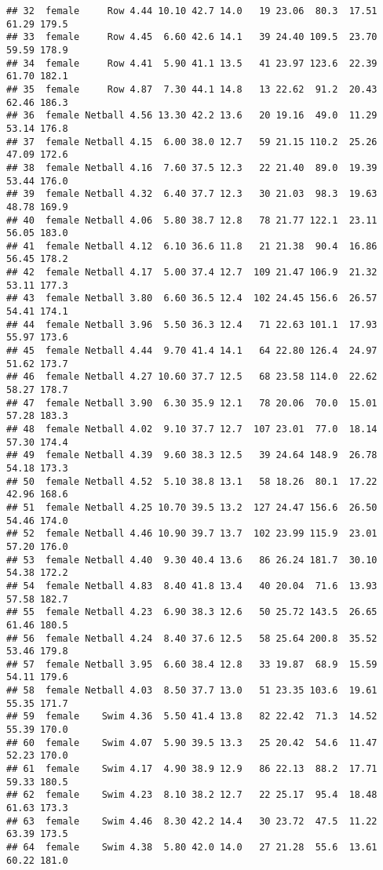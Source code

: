 \documentclass[
]{article}
\begin{document}
\begin{verbatim}
## 32  female     Row 4.44 10.10 42.7 14.0   19 23.06  80.3  17.51  61.29 179.5
## 33  female     Row 4.45  6.60 42.6 14.1   39 24.40 109.5  23.70  59.59 178.9
## 34  female     Row 4.41  5.90 41.1 13.5   41 23.97 123.6  22.39  61.70 182.1
## 35  female     Row 4.87  7.30 44.1 14.8   13 22.62  91.2  20.43  62.46 186.3
## 36  female Netball 4.56 13.30 42.2 13.6   20 19.16  49.0  11.29  53.14 176.8
## 37  female Netball 4.15  6.00 38.0 12.7   59 21.15 110.2  25.26  47.09 172.6
## 38  female Netball 4.16  7.60 37.5 12.3   22 21.40  89.0  19.39  53.44 176.0
## 39  female Netball 4.32  6.40 37.7 12.3   30 21.03  98.3  19.63  48.78 169.9
## 40  female Netball 4.06  5.80 38.7 12.8   78 21.77 122.1  23.11  56.05 183.0
## 41  female Netball 4.12  6.10 36.6 11.8   21 21.38  90.4  16.86  56.45 178.2
## 42  female Netball 4.17  5.00 37.4 12.7  109 21.47 106.9  21.32  53.11 177.3
## 43  female Netball 3.80  6.60 36.5 12.4  102 24.45 156.6  26.57  54.41 174.1
## 44  female Netball 3.96  5.50 36.3 12.4   71 22.63 101.1  17.93  55.97 173.6
## 45  female Netball 4.44  9.70 41.4 14.1   64 22.80 126.4  24.97  51.62 173.7
## 46  female Netball 4.27 10.60 37.7 12.5   68 23.58 114.0  22.62  58.27 178.7
## 47  female Netball 3.90  6.30 35.9 12.1   78 20.06  70.0  15.01  57.28 183.3
## 48  female Netball 4.02  9.10 37.7 12.7  107 23.01  77.0  18.14  57.30 174.4
## 49  female Netball 4.39  9.60 38.3 12.5   39 24.64 148.9  26.78  54.18 173.3
## 50  female Netball 4.52  5.10 38.8 13.1   58 18.26  80.1  17.22  42.96 168.6
## 51  female Netball 4.25 10.70 39.5 13.2  127 24.47 156.6  26.50  54.46 174.0
## 52  female Netball 4.46 10.90 39.7 13.7  102 23.99 115.9  23.01  57.20 176.0
## 53  female Netball 4.40  9.30 40.4 13.6   86 26.24 181.7  30.10  54.38 172.2
## 54  female Netball 4.83  8.40 41.8 13.4   40 20.04  71.6  13.93  57.58 182.7
## 55  female Netball 4.23  6.90 38.3 12.6   50 25.72 143.5  26.65  61.46 180.5
## 56  female Netball 4.24  8.40 37.6 12.5   58 25.64 200.8  35.52  53.46 179.8
## 57  female Netball 3.95  6.60 38.4 12.8   33 19.87  68.9  15.59  54.11 179.6
## 58  female Netball 4.03  8.50 37.7 13.0   51 23.35 103.6  19.61  55.35 171.7
## 59  female    Swim 4.36  5.50 41.4 13.8   82 22.42  71.3  14.52  55.39 170.0
## 60  female    Swim 4.07  5.90 39.5 13.3   25 20.42  54.6  11.47  52.23 170.0
## 61  female    Swim 4.17  4.90 38.9 12.9   86 22.13  88.2  17.71  59.33 180.5
## 62  female    Swim 4.23  8.10 38.2 12.7   22 25.17  95.4  18.48  61.63 173.3
## 63  female    Swim 4.46  8.30 42.2 14.4   30 23.72  47.5  11.22  63.39 173.5
## 64  female    Swim 4.38  5.80 42.0 14.0   27 21.28  55.6  13.61  60.22 181.0

\end{verbatim}
\end{document}
